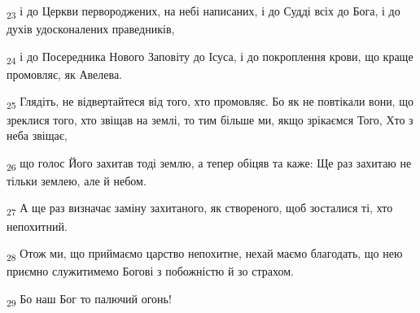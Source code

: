 \begin{tcolorbox}
\textsubscript{23} і до Церкви первороджених, на небі написаних, і до Судді всіх до Бога, і до духів удосконалених праведників,
\end{tcolorbox}
\begin{tcolorbox}
\textsubscript{24} і до Посередника Нового Заповіту до Ісуса, і до покроплення крови, що краще промовляє, як Авелева.
\end{tcolorbox}
\begin{tcolorbox}
\textsubscript{25} Глядіть, не відвертайтеся від того, хто промовляє. Бо як не повтікали вони, що зреклися того, хто звіщав на землі, то тим більше ми, якщо зрікаємся Того, Хто з неба звіщає,
\end{tcolorbox}
\begin{tcolorbox}
\textsubscript{26} що голос Його захитав тоді землю, а тепер обіцяв та каже: Ще раз захитаю не тільки землею, але й небом.
\end{tcolorbox}
\begin{tcolorbox}
\textsubscript{27} А ще раз визначає заміну захитаного, як створеного, щоб зосталися ті, хто непохитний.
\end{tcolorbox}
\begin{tcolorbox}
\textsubscript{28} Отож ми, що приймаємо царство непохитне, нехай маємо благодать, що нею приємно служитимемо Богові з побожністю й зо страхом.
\end{tcolorbox}
\begin{tcolorbox}
\textsubscript{29} Бо наш Бог то палючий огонь!
\end{tcolorbox}
